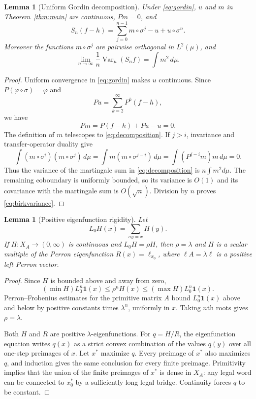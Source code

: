 \documentclass[11pt]{article}
\newtheorem{lemma}[theorem]{Lemma}
\theoremstyle{definition}
\theoremstyle{remark}
\newcommand{\Var}{\operatorname{Var}}
\newcommand{\one}{\mathbf 1}
\begin{document}
\begin{lemma}[Uniform Gordin decomposition]\label{lem:gordin}
Under \eqref{eq:gordin}, $u$ and $m$ in Theorem~\ref{thm:main} are
continuous, $Pm=0$, and
\begin{equation}\label{eq:decomposition}
 S_n(f-h)=\sum_{j=0}^{n-1}m\circ\sigma^j-u+u\circ\sigma^n.
\end{equation}
Moreover the functions $m\circ\sigma^j$ are pairwise orthogonal in
$L^2(\mu)$, and
\begin{equation}\label{eq:birkvariance}
 \lim_{n\to\infty}\frac1n\Var_\mu(S_nf)=\int m^2\,d\mu.
\end{equation}
\end{lemma}

\begin{proof}
Uniform convergence in \eqref{eq:gordin} makes $u$ continuous.  Since
$P(\varphi\circ\sigma)=\varphi$ and
\[
 Pu=\sum_{k=2}^{\infty}P^k(f-h),
\]
we have
\[
 Pm=P(f-h)+Pu-u=0.
\]
The definition of $m$ telescopes to \eqref{eq:decomposition}.  If $j>i$,
invariance and transfer-operator duality give
\[
 \int (m\circ\sigma^i)(m\circ\sigma^j)\,d\mu
 =\int m(m\circ\sigma^{j-i})\,d\mu
 =\int (P^{j-i}m)m\,d\mu=0.
\]
Thus the variance of the martingale sum in \eqref{eq:decomposition} is
$n\int m^2d\mu$.  The remaining coboundary is uniformly bounded, so its
variance is $O(1)$ and its covariance with the martingale sum is
$O(\sqrt n)$.  Division by $n$ proves \eqref{eq:birkvariance}.
\end{proof}

\begin{lemma}[Positive eigenfunction rigidity]\label{lem:pf}
Let
\[
 L_0H(x)=\sum_{\sigma y=x}H(y).
\]
If $H:X_A\to(0,\infty)$ is continuous and $L_0H=\rho H$, then
$\rho=\lambda$ and $H$ is a scalar multiple of the Perron eigenfunction
$R(x)=\ell_{x_0}$, where $\ell A=\lambda\ell$ is a positive left Perron
vector.
\end{lemma}

\begin{proof}
Since $H$ is bounded above and away from zero,
\[
 (\min H)L_0^n\one(x)\le \rho^nH(x)
 \le(\max H)L_0^n\one(x).
\]
Perron--Frobenius estimates for the primitive matrix $A$ bound
$L_0^n\one(x)$ above and below by positive constants times $\lambda^n$,
uniformly in $x$.  Taking $n$th roots gives $\rho=\lambda$.

Both $H$ and $R$ are positive $\lambda$-eigenfunctions.  For
$q=H/R$, the eigenfunction equation writes $q(x)$ as a strict convex
combination of the values $q(y)$ over all one-step preimages of $x$.
Let $x^*$ maximize $q$.  Every preimage of $x^*$ also maximizes $q$, and
induction gives the same conclusion for every finite preimage.  Primitivity
implies that the union of the finite preimages of $x^*$ is dense in $X_A$:
any legal word can be connected to $x_0^*$ by a sufficiently long legal
bridge.  Continuity forces $q$ to be constant.
\end{proof}
\end{document}
